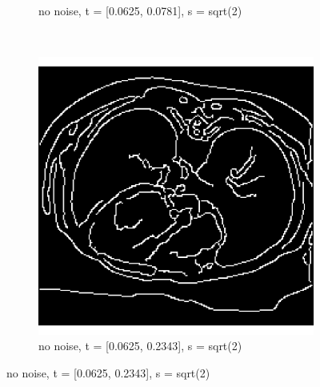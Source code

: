 \begin{figure}[H]
\begin{subfigure}{.5\textwidth}
    \caption{no noise, t = [0.0625, 0.0781], s = sqrt(2)}
    \label{fig:cany_no_noise}
  \end{subfigure}\\%
  \begin{subfigure}{.5\textwidth}
    \centering
    \includegraphics[width=.9\textwidth]{./canny1/no_noise_t_00625_02343}
    \caption{no noise, t = [0.0625, 0.2343], s = sqrt(2)}
    \label{fig:cany_no_noise}
  \end{subfigure}%
  
\end{figure}